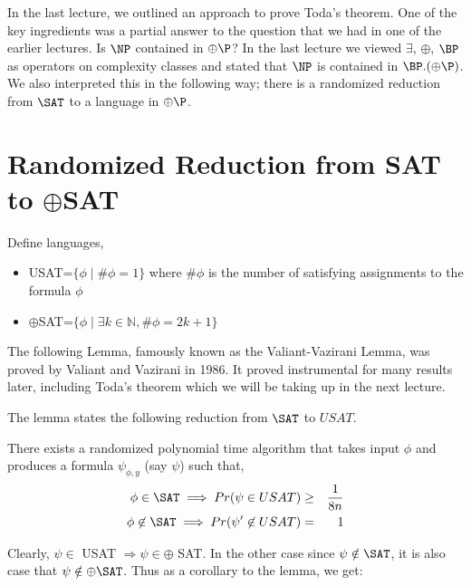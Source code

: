

In the last lecture, we outlined an approach to prove Toda's theorem. One of the key ingredients was a partial answer to the question that we had in one of the earlier lectures. Is $\NP$ contained in $\oplus\P$? In the last lecture we viewed $\exists$, $\oplus$, $\BP$ as operators on complexity classes and stated that $\NP$ is contained in $\BP.(\oplus\P)$. 
We also interpreted this in the following way; there is a randomized reduction from $\SAT$ to a language in $\oplus\P$.

\section{Randomized Reduction from SAT to $\oplus$SAT}
Define languages, 
\begin{itemize}
\item[]USAT=$\{\phi \mid \#\phi=1\}$ \newline where $\#\phi$ is the number of satisfying assignments to the formula $\phi$
\item[]$\oplus$SAT=$\{\phi \mid \exists k \in \mathbb{N}, \#\phi=2k+1\}$
\end{itemize}

The following Lemma, famously known as the Valiant-Vazirani Lemma, was proved by Valiant and Vazirani in 1986. It proved instrumental for many results later, including Toda's theorem which we will be taking up in the next lecture.

The lemma states the following reduction from $\SAT$ to $USAT$. 

\begin{lemma}
There exists a randomized polynomial time algorithm that takes input $\phi$ and produces a formula $\psi_{\phi,y}$ (say $\psi$) such that,
\begin{eqnarray*}
\phi \in \SAT \implies Pr(\psi \in USAT) & \geq & \frac{1}{8n} \\
\phi \not\in \SAT \implies Pr (\psi' \not\in USAT) & = & 1
\end{eqnarray*}
\end{lemma}

Clearly, $\psi \in$ USAT $\Rightarrow \psi \in \oplus$ SAT. In the other case since $\psi \notin \SAT$, it is also case that $\psi \notin \oplus\SAT$. Thus as a corollary to the lemma, we get:

